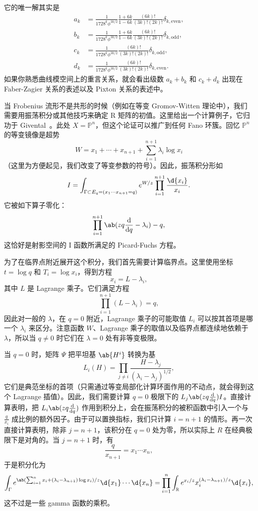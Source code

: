 \documentclass{amsart}
\theoremstyle{definition}
\theoremstyle{remark}
\theoremstyle{plain}
\theoremstyle{definition}
\theoremstyle{remark}
\newcommand{\R}{\mathbb{R}}
\renewcommand{\P}{\mathbb{P}}
\newcommand{\1}{\mathbf{1}}
\newcommand{\2}{\mathbf{2}}
\newcommand{\3}{\mathbf{3}}
\begin{document}
它的唯一解其实是
\begin{align*}
    a_k &= \frac{1}{1728^k \phi^{3k/2}} \frac{1+6k}{1-6k} \frac{(6k)!}{(3k)!(2k)!} \delta_{k, \text{even}},  \\
    b_k &= \frac{1}{1728^k \phi^{3k/2}} \frac{1+6k}{1-6k}\frac{(6k)!}{(3k)!(2k)!} \delta_{k, \text{odd}},  \\
    c_k &= \frac{1}{1728^k \phi^{3k/2}}\frac{(6k)!}{(3k)!(2k)!} \delta_{k, \text{odd}}, \\
    d_k &= \frac{1}{1728^k \phi^{3k/2}} \frac{(6k)!}{(3k)!(2k)!} \delta_{k, \text{even}}. 
\end{align*}
如果你熟悉曲线模空间上的重言关系，就会看出级数 \(a_k + b_k\) 和 \(c_k + d_k\) 出现在 Faber-Zagier 关系的表述以及 Pixton 关系的表述中。

当 Frobenius 流形不是共形的时候（例如在等变 Gromov-Witten 理论中），我们需要用振荡积分或其他技巧来确定 R 矩阵的初值。这里给出一个计算例子，它归功于 Givental~\cite{Givental2001semisimple}。此处 \(X = \P^n\)，但这个论证可以推广到任何 Fano 环簇。回忆 \(\P^n\) 的等变镜像是超势
\[ W = x_1 + \cdots + x_{n+1} + \sum_{i=1}^{n+1} \lambda_i \log x_i \]
（这里为方便起见，我们改变了等变参数的符号）。因此，振荡积分形如
\[ I = \int_{\Gamma \subset E_q = (x_1 \cdots x_{n+1}=q)} e^{W/z} \prod_{i=1}^{n+1} \frac{\d{x_i}}{x_i}. \]
它被如下算子零化：
\[ \prod_{i=1}^{n+1}\ab(zq \odv{}{q} -\lambda_i) - q, \]
这恰好是射影空间的 I 函数所满足的 Picard-Fuchs 方程。

为了在临界点附近展开这个积分，我们首先需要计算临界点。这里使用坐标 \(t = \log q\) 和 \(T_i = \log x_i\)，得到方程
\[ x_i = L - \lambda_i, \]
其中 \(L\) 是 Lagrange 乘子。它们满足方程
\[ \prod_{i=1}^{n+1} (L - \lambda_i) = q, \]
因此对一般的 \(\lambda\)，在 \(q = 0\) 附近，Lagrange 乘子的可能取值 \(L_i\) 可以按其首项是哪一个 \(\lambda_i\) 来区分。注意函数 \(W\)、Lagrange 乘子的取值以及临界点都连续地依赖于 \(\lambda\)，所以当 \(q \neq 0\) 时它们在 \(\lambda = 0\) 处有非等变极限。

当 \(q = 0\) 时，矩阵 \(\Psi\) 把平坦基 \(\ab{H^i}\) 转换为基
\[ L_i(H) = \prod_{j \neq i} \frac{H - \lambda_j}{(\lambda_i - \lambda_j)^{1/2}}, \]
它们是典范坐标的首项（只需通过等变局部化计算环面作用的不动点，就会得到这个 Lagrange 插值）。因此，我们需要计算 \(q = 0\) 极限下的 \(L_j \ab(z q \odv{}{q}) I\)。直接计算表明，把 \(L_i \ab(z q \odv{}{q})\) 作用到积分上，会在振荡积分的被积函数中引入一个与 \(\frac{q}{x_i}\) 成比例的额外因子。由于可以置换指标，我们只计算 \(i = n+1\) 的情形。再一次直接计算表明，除非 \( j = n+1\)，该积分在 \(q = 0\) 处为零，所以实际上 \(R\) 在经典极限下是对角的。当 \(j = n+1\) 时，有
\[ \frac{q}{x_{n+1}} = x_1 \cdots x_n, \]
于是积分化为
\[ \int_{\Gamma} e^{\ab( \sum_{i=1}^n x_i + (\lambda_i - \lambda_{n+1})\log x_i ) / z} \d{x_1} \cdots \d{x_n} = \prod_{i=1}^n \int_{\R} e^{x_i/z} x_i^{(\lambda_i - \lambda_{n+1})/z} \d{x_i}, \]
这不过是一些 gamma 函数的乘积。
\end{document}
